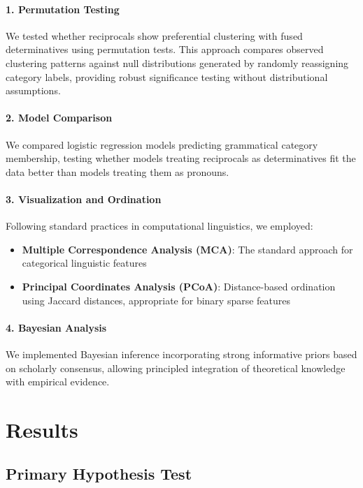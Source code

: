\documentclass[12pt]{article}
\begin{document}
\paragraph{1. Permutation Testing}
We tested whether reciprocals show preferential clustering with fused determinatives using permutation tests. This approach compares observed clustering patterns against null distributions generated by randomly reassigning category labels, providing robust significance testing without distributional assumptions.

\paragraph{2. Model Comparison}
We compared logistic regression models predicting grammatical category membership, testing whether models treating reciprocals as determinatives fit the data better than models treating them as pronouns.

\paragraph{3. Visualization and Ordination}
Following standard practices in computational linguistics, we employed:
\begin{itemize}
\item \textbf{Multiple Correspondence Analysis (MCA)}: The standard approach for categorical linguistic features
\item \textbf{Principal Coordinates Analysis (PCoA)}: Distance-based ordination using Jaccard distances, appropriate for binary sparse features
\end{itemize}

\paragraph{4. Bayesian Analysis}
We implemented Bayesian inference incorporating strong informative priors based on scholarly consensus, allowing principled integration of theoretical knowledge with empirical evidence.

\section{Results}

\subsection{Primary Hypothesis Test}
\end{document}
